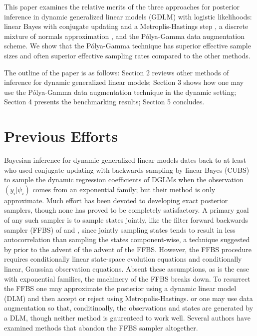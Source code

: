 \documentclass[11pt]{article}
\newcommand{\Polya}{P\'{o}lya}
\begin{document}
This paper examines the relative merits of the three approaches for posterior
inference in dynamic generalized linear models (GDLM) with logistic likelihoods:
linear Bayes with conjugate updating and a Metroplis-Hastings step
\citep{ravines-etal-2006}, a discrete mixture of normals approximation
\citep{fruhwirth-schnatter-etal-2009, fussl-etal-2013}, and the \Polya-Gamma
data augmentation scheme.  We show that the \Polya-Gamma technique has superior
effective sample sizes and often superior effective sampling rates compared to
the other methods.

The outline of the paper is as follows: Section 2 reviews other methods of
inference for dynamic generalized linear models; Section 3 shows how one may use
the \Polya-Gamma data augmentation technique in the dynamic setting; Section 4
presents the benchmarking results; Section 5 concludes.

\section{Previous Efforts}

Bayesian inference for dynamic generalized linear models dates back to at least
\cite{west-etal-1985} who used conjugate updating with backwards sampling by
linear Bayes (CUBS) to sample the dynamic regression coefficients of DGLMs when
the observation $(y_i | \psi_i)$ comes from an exponential family; but their
method is only approximate.  Much effort has been devoted to developing exact
posterior samplers, though none has proved to be completely satisfactory.  A
primary goal of any such sampler is to sample states jointly, like the filter
forward backwards sampler (FFBS) of \cite{fruhwirth-schnatter-1994} and
\cite{carter-kohn-1994}, since jointly sampling states tends to result in less
autocorrelation than sampling the states component-wise, a technique suggested
by \cite{carlin-etal-1992} prior to the advent of the advent of the FFBS.
However, the FFBS procedure requires conditionally linear state-space evolution
equations and conditionally linear, Gaussian observation equations.  Absent
these assumptions, as is the case with exponential families, the machinery of
the FFBS breaks down.  To resurrect the FFBS one may approximate the posterior
using a dynamic linear model (DLM) and then accept or reject using
Metropolis-Hastings. or one may use data augmentation so that, conditinoally,
the observations and states are generated by a DLM, though neither method is
gaurenteed to work well.  Several authors have examined methods that abandon the
FFBS sampler altogether.
\end{document}
